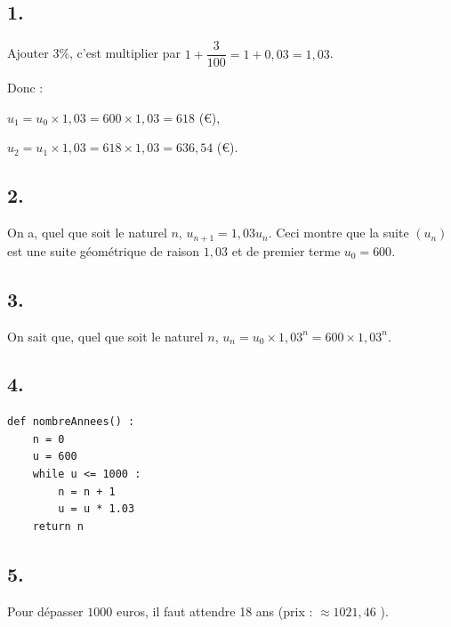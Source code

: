 \subsection*{1.}

Ajouter 3\%, c'est multiplier par \(1 + \dfrac{3}{100} = 1 + 0,03 = 1,03\).

Donc :

\(u_1 = u_0 \times 1,03 = 600 \times 1,03 = 618\) (€),

\(u_2 = u_1 \times 1,03 = 618 \times 1,03 = 636,54\) (€).

\subsection*{2.}

On a, quel que soit le naturel \(n\), \(u_{n+1} = 1,03 u_n\). Ceci montre que la suite \((u_n)\) est une suite géométrique de raison \(1,03\) et de premier terme \(u_0 = 600\).

\subsection*{3.}

On sait que, quel que soit le naturel \(n\), \(u_n = u_0 \times 1,03^n = 600 \times 1,03^n\).

\subsection*{4.}

\begin{lstlisting}[style=python]
def nombreAnnees() :
	n = 0
	u = 600
	while u <= 1000 :
		n = n + 1
		u = u * 1.03
	return n
\end{lstlisting}

\subsection*{5.}

Pour dépasser \(1000\) euros, il faut attendre 18 ans (prix : \(\approx 1021,46\) ).
